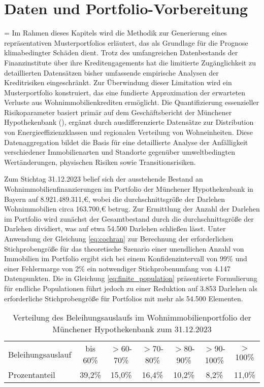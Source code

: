 \section{Daten und Portfolio-Vorbereitung}

\begin{sloppypar}
\emergencystretch=\hsize
Im Rahmen dieses Kapitels wird die Methodik zur Generierung eines repräsentativen Musterportfolios erläutert, das als Grundlage für die Prognose klimabedingter Schäden dient. Trotz des umfangreichen Datenbestands der Finanzinstitute über ihre Kredit\-engagements hat die limitierte Zugänglichkeit zu detaillierten Datensätzen bisher umfassende empirische Analysen der Kreditrisiken eingeschränkt. Zur Überwindung dieser Limitation wird ein Musterportfolio konstruiert, das eine fundierte Approximation der erwarteten Verluste aus Wohn\-immobilien\-krediten ermöglicht. Die Quantifizierung essenzieller Risikoparameter basiert primär auf dem Geschäftsbericht der Münchener Hypothekenbank (\cite{MuenchenerHyp2022}), ergänzt durch ausdifferenzierte Datensätze zur Distribution von Energie\-effizienz\-klassen und regionalen Verteilung von Wohneinheiten. Diese Datenaggregation bildet die Basis für eine detaillierte Analyse der Anfälligkeit verschiedener Immobilienarten und Standorte gegenüber umweltbedingten Wert\-änderungen, physischen Risiken sowie Transitions\-risiken.

Zum Stichtag 31.12.2023 belief sich der ausstehende Bestand an Wohnimmobilienfinanzierungen im Portfolio der Münchener Hypothekenbank in Bayern auf 8.921.489.311,€, wobei die durchschnittsgröße der Darlehen Wohnimmobilien circa 163.700,€ betrug. Zur Ermittlung der Anzahl der Darlehen im Portfolio wird zunächst der Gesamtbestand durch die durchschnittsgröße der Darlehen dividiert, was auf etwa 54.500 Darlehen schließen lässt.
Unter Anwendung der Gleichung \ref{eq:cochran} zur Berechnung der erforderlichen Stichprobengröße für das theoretische Szenario einer unendlichen Anzahl von Immobilien im Portfolio ergibt sich bei einem Konfidenzintervall von 99\% und einer Fehlermarge von 2\% ein notwendiger Stichprobenumfang von 4.147 Datenpunkten. Die in Gleichung \ref{eq:finite_population} präsentierte Formulierung für endliche Populationen führt jedoch zu einer Reduktion auf 3.853 Darlehen als erforderliche Stichprobengröße für Portfolios mit mehr als 54.500 Elementen.

\begin{table}[htbp]
    \centering
    \caption{Verteilung des Beleihungsauslaufs im Wohnimmobilienportfolio der Münchener Hypothekenbank zum 31.12.2023}
    \label{tab:beleihungsauslauf2023}
    \begin{tabular}{lcccccc}
    \toprule[0.5pt]
    Beleihungsauslauf & bis 60\% & $>$60-70\% & $>$70-80\% & $>$80-90\% & $>$90-100\% & $>$100\% \\
    Prozentanteil & 39,2\% & 15,0\% & 16,4\% & 10,2\% & 8,2\% & 11,0\% \\
    \bottomrule[1.5pt]
    \end{tabular}
\end{table}


\end{sloppypar}
